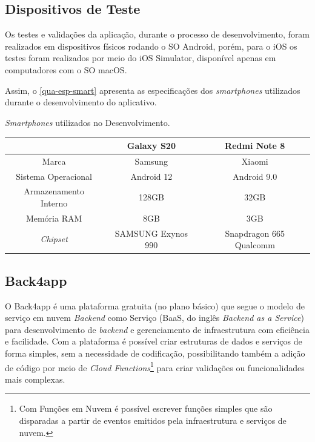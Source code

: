 \newpage

\subsection{Dispositivos de Teste}

Os testes e validações da aplicação, durante o processo de desenvolvimento, foram realizados em dispositivos físicos
rodando o SO Android, porém, para o iOS os testes foram realizados por meio do iOS Simulator, disponível apenas em
computadores com o SO macOS.

Assim, o \autoref{qua-esp-smart} apresenta as especificações dos \emph{smartphones} utilizados durante o desenvolvimento
do aplicativo.

\begin{quadro}[htb!]
    \begin{center}
        \ABNTEXfontereduzida
        \caption{\label{qua-esp-smart}\emph{Smartphones} utilizados no Desenvolvimento.}
        \begin{tabular}{|c|c|c|}
            \hline
                                  & \textbf{Galaxy S20} & \textbf{Redmi Note 8}   \\
            \hline
            Marca                 & Samsung             & Xiaomi                  \\
            \hline
            Sistema Operacional   & Android 12          & Android 9.0             \\
            \hline
            Armazenamento Interno & 128GB               & 32GB                    \\
            \hline
            Memória RAM           & 8GB                 & 3GB                     \\
            \hline
            \emph{Chipset}        & SAMSUNG Exynos 990  & Snapdragon 665 Qualcomm \\
            \hline
        \end{tabular}
    \end{center}
\end{quadro}

\subsection{Back4app}

O Back4app é uma plataforma gratuita (no plano básico) que segue o modelo de serviço em nuvem \emph{Backend} como Serviço (BaaS, do inglês \emph{Backend as a Service})
para desenvolvimento de \emph{backend} e gerenciamento de infraestrutura com eficiência e facilidade. Com a plataforma é possível
criar estruturas de dados e serviços de forma simples, sem a necessidade de codificação, possibilitando também a adição de código por meio de \emph{Cloud
    Functions}\footnote{Com Funções em Nuvem é possível escrever funções simples que são disparadas a partir de eventos emitidos
    pela infraestrutura e serviços de nuvem.} para criar validações ou funcionalidades mais complexas.


